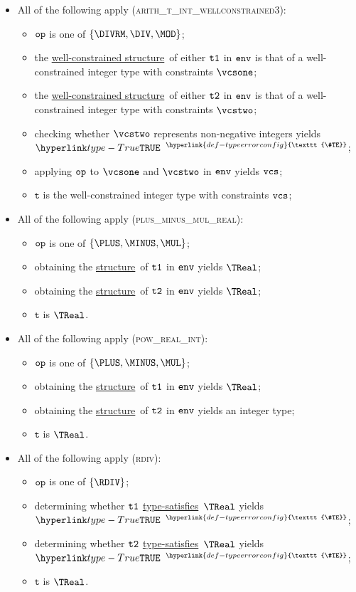\documentclass{book}
\newcommand\TypeErrorConfig[0]{\hyperlink{def-typeerrorconfig}{\texttt{\#TE}}}
\newcommand\ProseOrTypeError[0]{\hyperlink{def-proseortypeerror}{$^{\TypeErrorConfig}$}}
\newcommand\structure[0]{\hyperlink{def-structure}{structure}}
\newcommand\typesatisfies[0]{\hyperlink{def-typesatisfies}{type-satisfies}}
\newcommand\wellconstrainedstructure[0]{\hyperlink{def-getwellconstrainedstructure}{well-constrained structure}}
\newcommand\vt[0]{\texttt{t}}
\begin{document}
\begin{itemize}
  \item All of the following apply (\textsc{arith\_t\_int\_wellconstrained3}):
  \begin{itemize}
    \item $\texttt{op}$ is one of $\{\DIVRM, \DIV, \MOD\}$;
    \item the \wellconstrainedstructure\ of either $\texttt{t1}$ in $\texttt{env}$ is that of a well-constrained integer type with
          constraints $\vcsone$;
          \item the \wellconstrainedstructure\ of either $\texttt{t2}$ in $\texttt{env}$ is that of a well-constrained integer type with
          constraints $\vcstwo$;
    \item checking whether $\vcstwo$ represents non-negative integers yields $\True$ \ProseOrTypeError;
    \item applying $\texttt{op}$ to $\vcsone$ and $\vcstwo$ in $\texttt{env}$ yields $\texttt{vcs}$;
    \item $\vt$ is the well-constrained integer type with constraints $\texttt{vcs}$;
  \end{itemize}

  \item All of the following apply (\textsc{plus\_minus\_mul\_real}):
  \begin{itemize}
    \item $\texttt{op}$ is one of $\{\PLUS, \MINUS, \MUL\}$;
    \item obtaining the \structure\ of $\texttt{t1}$ in $\texttt{env}$ yields $\TReal$;
    \item obtaining the \structure\ of $\texttt{t2}$ in $\texttt{env}$ yields $\TReal$;
    \item $\vt$ is $\TReal$.
  \end{itemize}

  \item All of the following apply (\textsc{pow\_real\_int}):
  \begin{itemize}
    \item $\texttt{op}$ is one of $\{\PLUS, \MINUS, \MUL\}$;
    \item obtaining the \structure\ of $\texttt{t1}$ in $\texttt{env}$ yields $\TReal$;
    \item obtaining the \structure\ of $\texttt{t2}$ in $\texttt{env}$ yields an integer type;
    \item $\vt$ is $\TReal$.
  \end{itemize}

  \item All of the following apply (\textsc{rdiv}):
  \begin{itemize}
    \item $\texttt{op}$ is one of $\{\RDIV\}$;
    \item determining whether $\texttt{t1}$ \typesatisfies\ $\TReal$ yields $\True$ \ProseOrTypeError;
    \item determining whether $\texttt{t2}$ \typesatisfies\ $\TReal$ yields $\True$ \ProseOrTypeError;
    \item $\vt$ is $\TReal$.
  \end{itemize}
\end{itemize}
\end{document}
